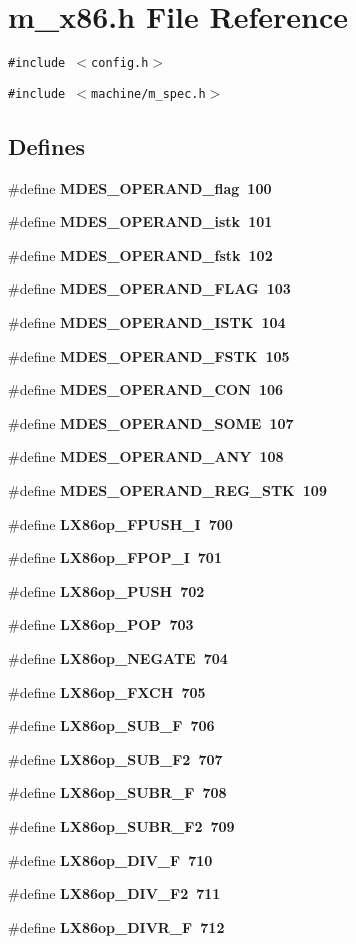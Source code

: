 \section{m\_\-x86.h File Reference}
\label{m__x86_8h}
{\tt \#include $<$config.h$>$}\par
{\tt \#include $<$machine/m\_\-spec.h$>$}\par
\subsection*{Defines}
\begin{CompactItemize}
\item 
\#define \bf{MDES\_\-OPERAND\_\-flag}~100
\item 
\#define \bf{MDES\_\-OPERAND\_\-istk}~101
\item 
\#define \bf{MDES\_\-OPERAND\_\-fstk}~102
\item 
\#define \bf{MDES\_\-OPERAND\_\-FLAG}~103
\item 
\#define \bf{MDES\_\-OPERAND\_\-ISTK}~104
\item 
\#define \bf{MDES\_\-OPERAND\_\-FSTK}~105
\item 
\#define \bf{MDES\_\-OPERAND\_\-CON}~106
\item 
\#define \bf{MDES\_\-OPERAND\_\-SOME}~107
\item 
\#define \bf{MDES\_\-OPERAND\_\-ANY}~108
\item 
\#define \bf{MDES\_\-OPERAND\_\-REG\_\-STK}~109
\item 
\#define \bf{LX86op\_\-FPUSH\_\-I}~700
\item 
\#define \bf{LX86op\_\-FPOP\_\-I}~701
\item 
\#define \bf{LX86op\_\-PUSH}~702
\item 
\#define \bf{LX86op\_\-POP}~703
\item 
\#define \bf{LX86op\_\-NEGATE}~704
\item 
\#define \bf{LX86op\_\-FXCH}~705
\item 
\#define \bf{LX86op\_\-SUB\_\-F}~706
\item 
\#define \bf{LX86op\_\-SUB\_\-F2}~707
\item 
\#define \bf{LX86op\_\-SUBR\_\-F}~708
\item 
\#define \bf{LX86op\_\-SUBR\_\-F2}~709
\item 
\#define \bf{LX86op\_\-DIV\_\-F}~710
\item 
\#define \bf{LX86op\_\-DIV\_\-F2}~711
\item 
\#define \bf{LX86op\_\-DIVR\_\-F}~712

\end{CompactItemize}
